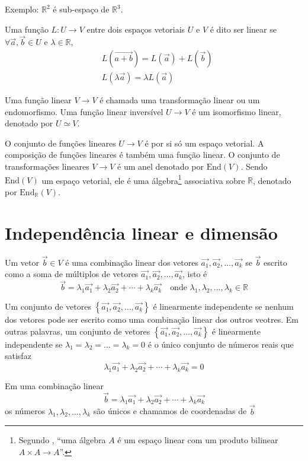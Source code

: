 \documentclass[12pt, oneside, a4paper, english, brazil]{abntex2}
\providecommand{\p}[1]{\left( #1 \right)}
\providecommand{\chaves}[1]{\left\{ #1 \right\}}
\providecommand{\Endo}[1]{\text{End}\left( #1 \right)}
\providecommand{\Endor}[1]{\text{End}_{\mathbb{R}}\left( #1 \right)}
\providecommand{\R}{\mathbb{R}}
\providecommand{\Rdois}{\mathbb{R}^2}
\providecommand{\Rtres}{\mathbb{R}^3}
\renewcommand{\vec}{\overrightarrow}
\theoremstyle{normal}
\theoremstyle{observacao}
\begin{document}
Exemplo: $\Rdois$ é sub-espaço de $\Rtres$.

Uma função $L: U \to V$ entre dois espaços vetoriais $U$ e $V$ é dito ser linear se $\forall \vec{a}, \vec{b} \in U$ e $\lambda \in \R$,
\begin{align*}
&L\p{\vec{a+b}}= L\p{\vec{a}} + L\p{\vec{b}}\\
&L\p{\lambda\vec{a}} = \lambda L \p{\vec{a}}
\end{align*}

Uma função linear $V \to V$ é chamada uma transformação linear ou um endomorfismo. Uma função linear inversível $U \to V$ é um isomorfismo linear, denotado por $U \simeq V$.

O conjunto de funções lineares $U \to V$ é por si só um espaço vetorial. A composição de funções lineares é também uma função linear. O conjunto de transformações lineares $V \to V$ é um anel denotado por $\Endo{V}$. Sendo $\Endo{V}$ um espaço vetorial, ele é uma álgebra\footnote{Segundo , ``uma álgebra $A$ é um espaço linear com um produto bilinear $A \times A \to A$''.} associativa sobre $\R$, denotado por $\Endor{V}$.

\section{Independência linear e dimensão}

Um vetor $\vec{b} \in V$ é uma combinação linear dos vetores $\vec{a_1}, \vec{a_2}, \ldots, \vec{a_k}$ se $\vec{b}$ escrito como a soma de múltiplos de vetores $\vec{a_1}, \vec{a_2}, \ldots, \vec{a_k}$, isto é
\[
\vec{b}=\lambda_1\vec{a_1}+\lambda_2\vec{a_2}+\cdots+\lambda_k\vec{a_k} \quad \text{onde } \lambda_1, \lambda_2, \ldots, \lambda_k \in \R
\]

Um conjunto de vetores $\chaves{\vec{a_1}, \vec{a_2}, \ldots, \vec{a_k}}$ é linearmente independente se nenhum dos vetores pode ser escrito como uma combinação linear dos outros veotres. Em outras palavras, um conjunto de vetores $\chaves{\vec{a_1}, \vec{a_2}, \ldots, \vec{a_k}}$ é linearmente independente se $\lambda_1=\lambda_2= \ldots=\lambda_k=0$ é o único conjunto de números reais que satisfaz
\[
\lambda_1\vec{a_1}+\lambda_2\vec{a_2}+\cdots+\lambda_k\vec{a_k}=0
\]

Em uma combinação linear
\[
\vec{b}=\lambda_1\vec{a_1}+\lambda_2\vec{a_2}+\cdots+\lambda_k\vec{a_k}
\]
os números $\lambda_1, \lambda_2, \ldots, \lambda_k$ são únicos e chamamos de coordenadas de $\vec{b}$
\end{document}
